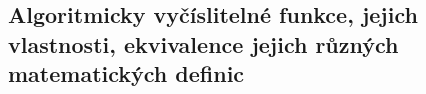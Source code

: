 \subsection{Algoritmicky vyčíslitelné funkce, jejich vlastnosti, ekvivalence jejich různých matematických definic}